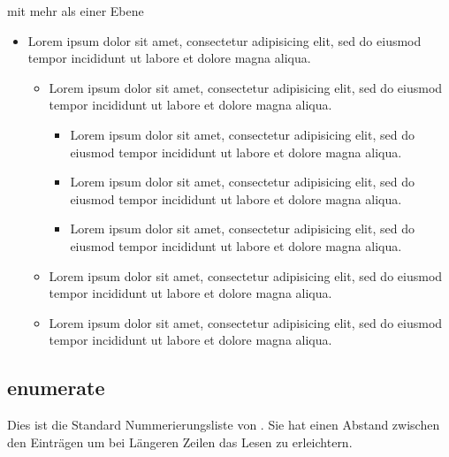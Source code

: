 mit mehr als einer Ebene

\begin{itemize}
   \item Lorem ipsum dolor sit amet, consectetur adipisicing elit, sed do eiusmod tempor incididunt ut labore et dolore magna aliqua.
%
   \begin{itemize}
      \item Lorem ipsum dolor sit amet, consectetur adipisicing elit, sed do eiusmod tempor incididunt ut labore et dolore magna aliqua.
      \begin{itemize}
         \item Lorem ipsum dolor sit amet, consectetur adipisicing elit, sed do eiusmod tempor incididunt ut labore et dolore magna aliqua.
         \item Lorem ipsum dolor sit amet, consectetur adipisicing elit, sed do eiusmod tempor incididunt ut labore et dolore magna aliqua.
         \item Lorem ipsum dolor sit amet, consectetur adipisicing elit, sed do eiusmod tempor incididunt ut labore et dolore magna aliqua.
      \end{itemize}
      \item Lorem ipsum dolor sit amet, consectetur adipisicing elit, sed do eiusmod tempor incididunt ut labore et dolore magna aliqua.
      \item Lorem ipsum dolor sit amet, consectetur adipisicing elit, sed do eiusmod tempor incididunt ut labore et dolore magna aliqua.
   \end{itemize}
\end{itemize}

\subsection{enumerate}
Dies ist die Standard Nummerierungsliste von \LaTeXe{}. Sie hat einen Abstand zwischen den Einträgen um bei Längeren Zeilen das Lesen zu erleichtern.


